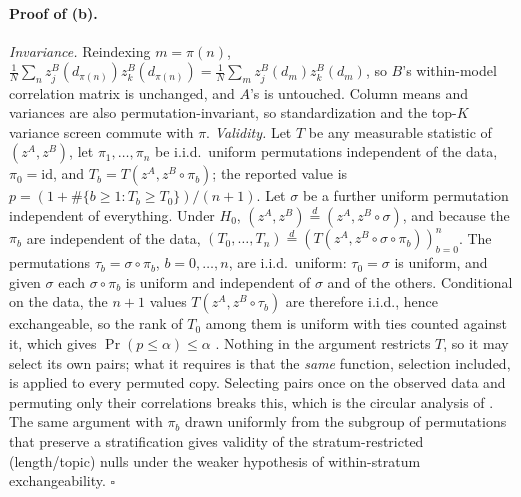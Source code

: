 \paragraph{Proof of (b).} \emph{Invariance.} Reindexing $m=\pi(n)$,
$\frac1N\sum_n z^B_j(d_{\pi(n)})z^B_k(d_{\pi(n)})=\frac1N\sum_m z^B_j(d_m)z^B_k(d_m)$, so $B$'s
within-model correlation matrix is unchanged, and $A$'s is untouched. Column means and variances
are also permutation-invariant, so standardization and the top-$K$ variance screen commute with
$\pi$. \emph{Validity.} Let $T$ be any measurable statistic of $(z^A,z^B)$, let
$\pi_1,\dots,\pi_{n}$ be i.i.d.\ uniform permutations independent of the data, $\pi_0=\mathrm{id}$,
and $T_b=T(z^A,z^B\!\circ\pi_b)$; the reported value is
$p=(1+\#\{b\ge1:T_b\ge T_0\})/(n+1)$. Let $\sigma$ be a further uniform permutation independent of
everything. Under $H_0$, $(z^A,z^B)\overset{d}{=}(z^A,z^B\!\circ\sigma)$, and because the
$\pi_b$ are independent of the data, $(T_0,\dots,T_n)\overset{d}{=}
(T(z^A,z^B\!\circ\sigma\circ\pi_b))_{b=0}^{n}$. The permutations $\tau_b=\sigma\circ\pi_b$,
$b=0,\dots,n$, are i.i.d.\ uniform: $\tau_0=\sigma$ is uniform, and given $\sigma$ each
$\sigma\circ\pi_b$ is uniform and independent of $\sigma$ and of the others. Conditional on the
data, the $n+1$ values $T(z^A,z^B\!\circ\tau_b)$ are therefore i.i.d., hence exchangeable, so the
rank of $T_0$ among them is uniform with ties counted against it, which gives
$\Pr(p\le\alpha)\le\alpha$ \citep{phipson2010permutation}. Nothing in the argument restricts
$T$, so it may select its own pairs; what it requires is that the \emph{same} function, selection
included, is applied to every permuted copy. Selecting pairs once on the observed data and
permuting only their correlations breaks this, which is the circular analysis of
\citet{kriegeskorte2009circular}. The same argument with $\pi_b$ drawn uniformly from the subgroup
of permutations that preserve a stratification gives validity of the stratum-restricted
(length/topic) nulls under the weaker hypothesis of within-stratum exchangeability.
\hfill$\square$

